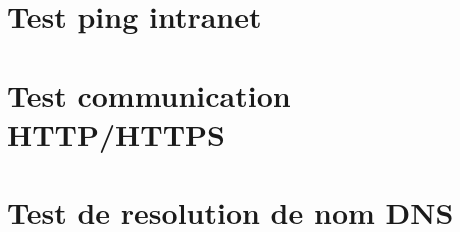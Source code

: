 \documentclass{article}
\begin{document}
\section{Test ping intranet}


\section{Test communication HTTP/HTTPS}



\section{Test de resolution de nom DNS}

\end{document}
